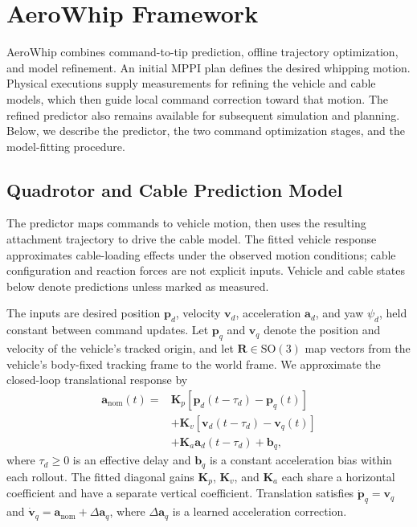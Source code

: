 \section{AeroWhip Framework}
\label{sec:aerowhip_framework}

AeroWhip combines command-to-tip prediction, offline trajectory
optimization, and model refinement. An initial MPPI plan
defines the desired whipping motion. Physical executions supply
measurements for refining the vehicle and cable models, which then
guide local command correction toward that motion. The refined
predictor also remains available for subsequent simulation and
planning. Below, we describe the predictor, the two command
optimization stages, and the model-fitting procedure.

\subsection{Quadrotor and Cable Prediction Model}
\label{subsec:prediction_model}

The predictor maps commands to vehicle motion, then uses the
resulting attachment trajectory to drive the cable model.
The fitted vehicle response approximates cable-loading effects
under the observed motion conditions; cable configuration and reaction
forces are not explicit inputs. Vehicle and cable states below
denote predictions unless marked as measured.

The inputs are desired position $\mathbf p_d$, velocity
$\mathbf v_d$, acceleration $\mathbf a_d$, and yaw $\psi_d$,
held constant between command updates. Let $\mathbf p_q$
and $\mathbf v_q$ denote the position and velocity of the
vehicle's tracked origin, and let $\mathbf R\in\mathrm{SO}(3)$
map vectors from the vehicle's body-fixed tracking frame to
the world frame.
We approximate the closed-loop translational response by
\begin{equation}
\begin{aligned}
\mathbf a_{\mathrm{nom}}(t)
={}&\mathbf K_p[\mathbf p_d(t-\tau_d)-\mathbf p_q(t)]\\
&+\mathbf K_v[\mathbf v_d(t-\tau_d)-\mathbf v_q(t)]\\
&+\mathbf K_a\mathbf a_d(t-\tau_d)+\mathbf b_q,
\end{aligned}
\label{eq:quadrotor_response}
\end{equation}
where $\tau_d\geq0$ is an effective delay and $\mathbf b_q$
is a constant acceleration bias within each rollout.
The fitted diagonal gains $\mathbf K_p$, $\mathbf K_v$, and
$\mathbf K_a$ each share a horizontal coefficient and have a
separate vertical coefficient. Translation satisfies
$\dot{\mathbf p}_q=\mathbf v_q$ and
$\dot{\mathbf v}_q=\mathbf a_{\mathrm{nom}}+\Delta\mathbf a_q$,
where $\Delta\mathbf a_q$ is a learned acceleration correction.


